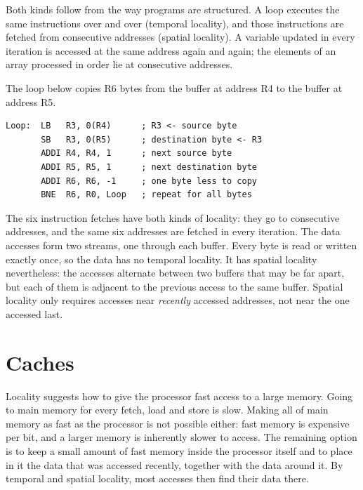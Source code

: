 \documentclass[../main.tex]{subfiles}
\begin{document}
Both kinds follow from the way programs are structured.  A loop executes the
same instructions over and over (temporal locality), and those instructions
are fetched from consecutive addresses (spatial locality).  A variable updated
in every iteration is accessed at the same address again and again; the
elements of an array processed in order lie at consecutive addresses.

\begin{example}
  \label{ex:l12-locality}
  The loop below copies R6 bytes from the buffer at address R4 to the
  buffer at address R5.
  \begin{lstlisting}[language={[x86masm]Assembler}, numbers=none]
Loop:  LB   R3, 0(R4)      ; R3 <- source byte
       SB   R3, 0(R5)      ; destination byte <- R3
       ADDI R4, R4, 1      ; next source byte
       ADDI R5, R5, 1      ; next destination byte
       ADDI R6, R6, -1     ; one byte less to copy
       BNE  R6, R0, Loop   ; repeat for all bytes
\end{lstlisting}
  The six instruction fetches have both kinds of locality: they go to
  consecutive addresses, and the same six addresses are fetched in every
  iteration.  The data accesses form two streams, one through each buffer.
  Every byte is read or written exactly once, so the data has no temporal
  locality.  It has spatial locality nevertheless: the accesses alternate
  between two buffers that may be far apart, but each of them is adjacent to
  the previous access to the same buffer.  Spatial locality only requires
  accesses near \emph{recently} accessed addresses, not near the one
  accessed last.
\end{example}

\section{Caches}
\label{sec:l12-caches}

Locality suggests how to give the processor fast access to a large
memory.
Going to main memory for every fetch, load and store is slow.  Making all of
main memory as fast as the processor is not possible either: fast memory is
expensive per bit, and a larger memory is inherently slower to access.  The
remaining option is to keep a small amount of fast memory inside the
processor itself and to place in it the data that was accessed recently,
together with the data around it.  By temporal and spatial locality, most
accesses then find their data there.
\end{document}
